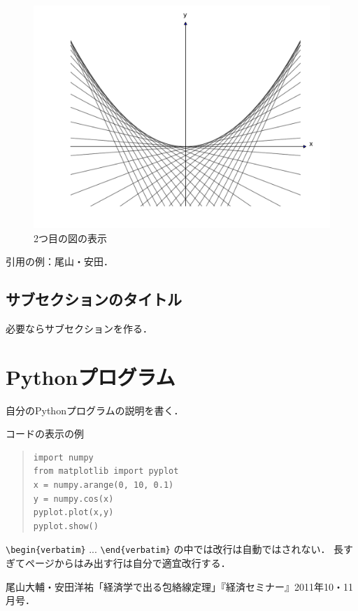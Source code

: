 \documentclass[11pt,a4j,fleqn]{jarticle}
\begin{document}
\begin{figure}
 \centering
 \includegraphics[scale=0.5]{envelope1.pdf}
 \caption{2つ目の図の表示}
 \label{fig:2}
\end{figure}



引用の例：尾山・安田\cite{OyamaYasuda11}．


\subsection{サブセクションのタイトル}

必要ならサブセクションを作る．



\section{Pythonプログラム}

自分のPythonプログラムの説明を書く．

コードの表示の例
\begin{quote}
\begin{verbatim}
import numpy
from matplotlib import pyplot
x = numpy.arange(0, 10, 0.1)
y = numpy.cos(x)
pyplot.plot(x,y)
pyplot.show()
\end{verbatim}
\end{quote}

\verb|\begin{verbatim}| ... \verb|\end{verbatim}| の中では改行は自動ではされない．
長すぎてページからはみ出す行は自分で適宜改行する．



\begin{thebibliography}{0}
尾山大輔・安田洋祐「経済学で出る包絡線定理」『経済セミナー』2011年10・11月号．
\end{thebibliography}
\end{document}
